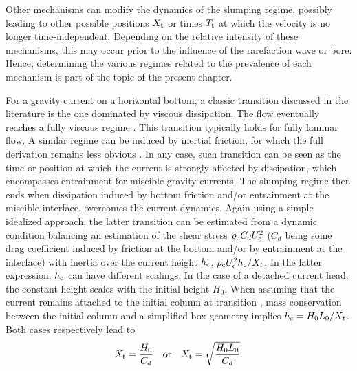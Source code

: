 \documentclass[12pt]{article}
\begin{document}
Other mechanisms can modify the dynamics of the slumping regime, possibly leading to other possible positions $X_{\text t}$ or times $T_{\text t}$ at which the velocity is no longer time-independent. Depending on the relative intensity of these mechanisms, this may occur prior to the influence of the rarefaction wave or bore. Hence, determining the various regimes related to the prevalence of each mechanism is part of the topic of the present chapter.

For a gravity current on a horizontal bottom, a classic transition discussed in the literature is the one dominated by viscous dissipation. The flow eventually reaches a fully viscous regime \citep{Huppert1980}. This transition typically holds for fully laminar flow. A similar regime can be induced by inertial friction, for which the full derivation remains less obvious \citep[see for instance][for the case of a constant-influx current]{Hogg2001}. In any case, such transition can be seen as the time or position at which the current is strongly affected by dissipation, which encompasses entrainment for miscible gravity currents. The slumping regime then ends when dissipation induced by bottom friction and/or entrainment at the miscible interface, overcomes the current dynamics.
%
Again using a simple idealized approach, the latter transition can be estimated from a dynamic condition balancing an estimation of the shear stress $\rho_{\text c} C_d U_{\text{c}}^2$ ($C_d$ being some drag coefficient induced by friction at the bottom and/or by entrainment at the interface) with inertia over the current height $h_{\text c}$, $\rho_{\text c} U_{\text{c}}^2 h_{\text c} /X_t$. In the latter expression, $h_{\text c}$ can have different scalings. In the case of a detached current head, the constant height scales with the initial height $H_0$. When assuming that the current remains attached to the initial column at transition \citep[similar to][but for inertial drag instead of viscous dissipation]{Bougouin2022}, mass conservation between the initial column and a simplified box geometry implies $h_{\text c} = H_0 L_0/X_t$.
%
Both cases respectively lead to
\begin{equation}
	\label{eq:Xt_drag}
	\displaystyle X_{\text t}= {\frac{H_0}{C_d}}\quad \mbox{or} \quad X_{\text t}=  \sqrt{\frac{H_0 L_0}{C_d}}.
\end{equation}
\end{document}
